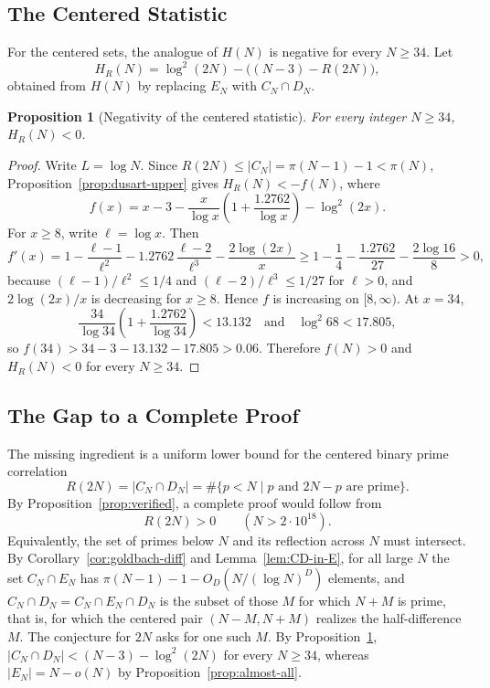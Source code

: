\documentclass[11pt]{amsart}
\newtheorem{Proposition}[Theorem]{Proposition}
\theoremstyle{definition}
\theoremstyle{remark}
\begin{document}
\subsection{The Centered Statistic}\label{subsec:HR-negative}
For the centered sets, the analogue of $H(N)$ is negative for every $N\geq 34$. Let
\[
H_R(N)=\log^2(2N)-\bigl((N-3)-R(2N)\bigr),
\]
obtained from $H(N)$ by replacing $E_N$ with $C_N\cap D_N$.
\begin{Proposition}[Negativity of the centered statistic]\label{prop:HR-negative}
For every integer $N\geq 34$, $H_R(N)<0$.
\end{Proposition}
\begin{proof}
Write $L=\log N$. Since $R(2N)\leq |C_N|=\pi(N-1)-1<\pi(N)$, Proposition~\ref{prop:dusart-upper} gives $H_R(N)<-f(N)$, where
\[
f(x)=x-3-\frac{x}{\log x}\left(1+\frac{1.2762}{\log x}\right)-\log^2(2x).
\]
For $x\geq 8$, write $\ell=\log x$. Then
\[
f'(x)=1-\frac{\ell-1}{\ell^2}-1.2762\,\frac{\ell-2}{\ell^3}-\frac{2\log(2x)}{x}\geq 1-\frac14-\frac{1.2762}{27}-\frac{2\log 16}{8}>0,
\]
because $(\ell-1)/\ell^2\leq 1/4$ and $(\ell-2)/\ell^3\leq 1/27$ for $\ell>0$, and $2\log(2x)/x$ is decreasing for $x\geq 8$. Hence $f$ is increasing on $[8,\infty)$. At $x=34$,
\[
\frac{34}{\log 34}\left(1+\frac{1.2762}{\log 34}\right)<13.132\quad\text{and}\quad \log^2 68<17.805,
\]
so $f(34)>34-3-13.132-17.805>0.06$. Therefore $f(N)>0$ and $H_R(N)<0$ for every $N\geq 34$.
\end{proof}

\subsection{The Gap to a Complete Proof}\label{subsec:proof-gap}
The missing ingredient is a uniform lower bound for the centered binary prime correlation
\[
R(2N)=|C_N\cap D_N|
=\#\{p<N \mid p \text{ and } 2N-p \text{ are prime}\}.
\]
By Proposition~\ref{prop:verified}, a complete proof would follow from
\[
R(2N)>0 \qquad (N>2\cdot 10^{18}).
\]
Equivalently, the set of primes below $N$ and its reflection across $N$ must intersect. By Corollary~\ref{cor:goldbach-diff} and Lemma~\ref{lem:CD-in-E}, for all large $N$ the set $C_N\cap E_N$ has $\pi(N-1)-1-O_D(N/(\log N)^D)$ elements, and $C_N\cap D_N=C_N\cap E_N\cap D_N$ is the subset of those $M$ for which $N+M$ is prime, that is, for which the centered pair $(N-M,N+M)$ realizes the half-difference $M$. The conjecture for $2N$ asks for one such $M$. By Proposition~\ref{prop:HR-negative}, $|C_N\cap D_N|<(N-3)-\log^2(2N)$ for every $N\geq 34$, whereas $|E_N|=N-o(N)$ by Proposition~\ref{prop:almost-all}.
\end{document}
